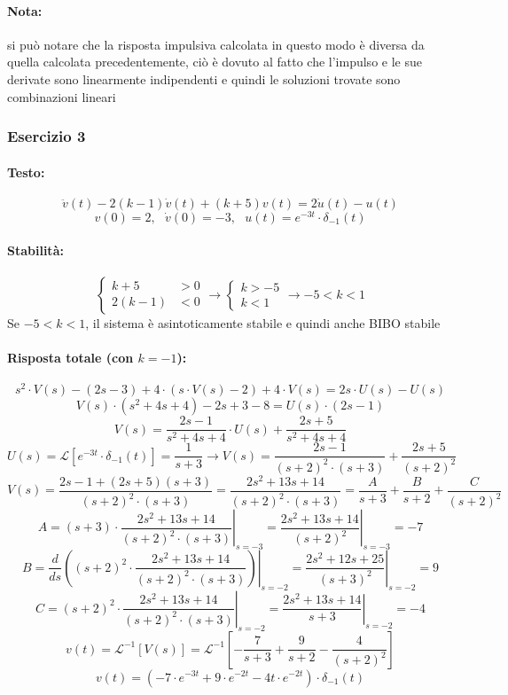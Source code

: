 \documentclass[a4paper]{article}
\begin{document}
	\paragraph{Nota:}
	si può notare che la risposta impulsiva calcolata in questo modo è diversa da quella calcolata precedentemente, ciò è dovuto al fatto che l'impulso e le sue derivate sono linearmente indipendenti e quindi le soluzioni trovate sono combinazioni lineari 
	
	
	\subsubsection{Esercizio 3}
	\paragraph{Testo:}
	\[ \ddot{v}(t) - 2(k-1) \dot{v}(t) + (k+5) v(t) = 2 \dot{u}(t) - u(t) \]
	\[ v(0) = 2, \text{ } \dot{v}(0) = -3, \text{ } u(t) = e^{-3t} \cdot \delta_{-1}(t) \]
	
	\paragraph{Stabilità:}
	\[
	\begin{cases}
	k+5 &> 0 \\
	2(k-1) &< 0
	\end{cases}
	\longrightarrow
	\begin{cases}
	k > -5 \\
	k < 1
	\end{cases}
	\longrightarrow
	-5 < k < 1
	\]
	Se $-5 < k < 1$, il sistema è asintoticamente stabile e quindi anche BIBO stabile
	
	\paragraph{Risposta totale (con $k=-1$):}
	\[ s^2 \cdot V(s) - (2s - 3) + 4 \cdot (s \cdot V(s) - 2) + 4 \cdot V(s) = 2s \cdot U(s) - U(s) \]
	\[ V(s) \cdot (s^2 + 4s + 4) - 2s + 3 - 8 = U(s) \cdot (2s - 1) \]
	\[ V(s) = \frac{2s - 1}{s^2 + 4s + 4} \cdot U(s) + \frac{2s + 5}{s^2 + 4s + 4} \]
	\[
	U(s) = \mathcal{L} \left[ e^{-3t} \cdot \delta_{-1}(t) \right] = \frac{1}{s+3}
	\longrightarrow
	V(s) = \frac{2s - 1}{(s+2)^2 \cdot (s+3)} + \frac{2s + 5}{(s+2)^2}
	\]
	\[
	V(s) = \frac{2s-1 + (2s+5)(s+3)}{(s+2)^2 \cdot (s+3)}
	= \frac{2s^2 + 13s + 14}{(s+2)^2 \cdot (s+3)}
	= \frac{A}{s+3} + \frac{B}{s+2} + \frac{C}{(s+2)^2}
	\]
	\[ A = \left. (s+3) \cdot \frac{2s^2 + 13s + 14}{(s+2)^2 \cdot (s+3)} \right|_{s=-3} = \left. \frac{2s^2 + 13s + 14}{(s+2)^2} \right|_{s=-3} = -7 \]
	\[ B = \frac{d}{ds} \left. \left( (s+2)^2 \cdot \frac{2s^2 + 13s + 14}{(s+2)^2 \cdot (s+3)} \right) \right|_{s=-2} = \left. \frac{2s^2 + 12s + 25}{(s+3)^2} \right|_{s=-2} = 9 \]
	\[ C = \left. (s+2)^2 \cdot \frac{2s^2 + 13s + 14}{(s+2)^2 \cdot (s+3)} \right|_{s=-2} = \left. \frac{2s^2 + 13s + 14}{s+3} \right|_{s=-2} = -4 \]
	\[ v(t) = \mathcal{L}^{-1} [V(s)] = \mathcal{L}^{-1} \left[- \frac{7}{s+3} + \frac{9}{s+2} - \frac{4}{(s+2)^2} \right] \]
	\[ v(t) = \left( -7 \cdot e^{-3t} + 9 \cdot e^{-2t} - 4t \cdot e^{-2t} \right) \cdot \delta_{-1}(t) \]
	
\end{document}
